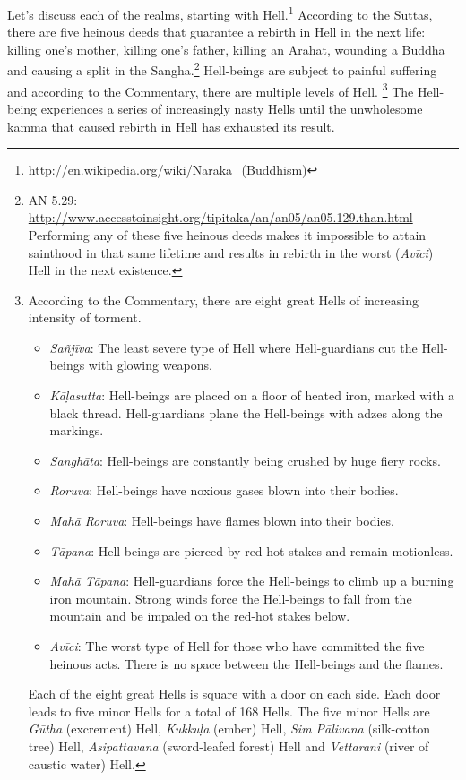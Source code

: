Let's discuss each of the realms, starting with Hell.\footnote{\url{http://en.wikipedia.org/wiki/Naraka_(Buddhism)}} According to the Suttas, there are five heinous deeds that guarantee a rebirth in Hell in the next life: killing one’s mother, killing one’s father, killing an Arahat, wounding a Buddha and causing a split in the Sangha.\footnote{AN 5.29: \url{http://www.accesstoinsight.org/tipitaka/an/an05/an05.129.than.html} \\ Performing any of these five heinous deeds makes it impossible to attain sainthood in that same lifetime and results in rebirth in the worst (\textit{Avīci}) Hell in the next existence.} Hell-beings are subject to painful suffering and according to the Commentary, there are multiple levels of Hell. \footnote{According to the Commentary, there are eight great Hells of increasing intensity of torment. 
\begin{itemize}[noitemsep,topsep=0pt]
\item \textit{Sañjīva}: The least severe type of Hell where Hell-guardians cut the Hell-beings with glowing weapons.
\item \textit{Kāḷasutta}: Hell-beings are placed on a floor of heated iron, marked with a black thread. Hell-guardians plane the Hell-beings with adzes along the markings.
\item \textit{Sanghāta}: Hell-beings are constantly being crushed by huge fiery rocks.
\item \textit{Roruva}: Hell-beings have noxious gases blown into their bodies.
\item \textit{Mahā Roruva}: Hell-beings have flames blown into their bodies.
\item \textit{Tāpana}: Hell-beings are pierced by red-hot stakes and remain motionless.
\item \textit{Mahā Tāpana}: Hell-guardians force the Hell-beings to climb up a burning iron mountain. Strong winds force the Hell-beings to fall from the mountain and be impaled on the red-hot stakes below.
\item \textit{Avīci}: The worst type of Hell for those who have committed the five heinous acts. There is no space between the Hell-beings and the flames. 
\end{itemize}
Each of the eight great Hells is square with a door on each side. Each door leads to five minor Hells for a total of 168 Hells. The five minor Hells are \textit{Gūtha} (excrement) Hell, \textit{Kukkuḷa} (ember) Hell, \textit{Sim Pālivana} (silk-cotton tree) Hell, \textit{Asipattavana} (sword-leafed forest) Hell and \textit{Vettarani} (river of caustic water) Hell.} The Hell-being experiences a series of increasingly nasty Hells until the unwholesome kamma that caused rebirth in Hell has exhausted its result. 

